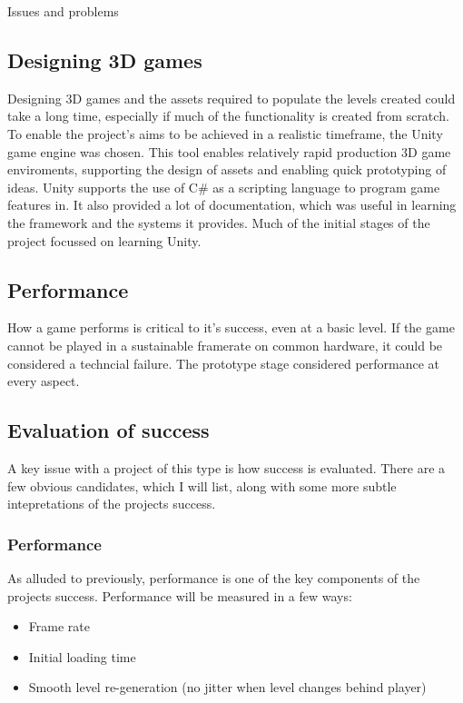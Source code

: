 \documentclass[progress]{cmpreport}
\begin{document}
\begin{section}{Issues and problems}

\subsection{Designing 3D games}
Designing 3D games and the assets required to populate the levels created could take a long time, especially if much of the functionality is created from scratch. To enable the project's aims to be achieved in a realistic timeframe, the Unity game engine was chosen. This tool enables relatively rapid production 3D game enviroments, supporting the design of assets and enabling quick prototyping of ideas. Unity supports the use of C\# as a scripting language to program game features in. It also provided a lot of documentation, which was useful in learning the framework and the systems it provides. Much of the initial stages of the project focussed on learning Unity.

\subsection{Performance}
How a game performs is critical to it's success, even at a basic level. If the game cannot be played in a sustainable framerate on common hardware, it could be considered a techncial failure. The prototype stage considered performance at every aspect.

\subsection{Evaluation of success}
A key issue with a project of this type is how success is evaluated. There are a few obvious candidates, which I will list, along with some more subtle intepretations of the projects success.

\subsubsection{Performance}
As alluded to previously, performance is one of the key components of the projects success. Performance will be measured in a few ways:
\begin{itemize}
    \item{Frame rate}
    \item{Initial loading time}
    \item{Smooth level re-generation (no jitter when level changes behind player)}
\end{itemize}


\end{section}
\end{document}
